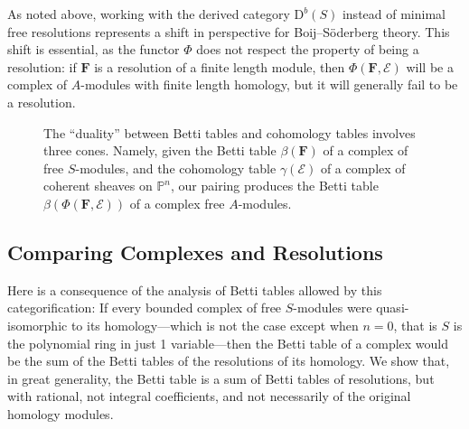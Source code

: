 \documentclass[12pt]{amsart}
\theoremstyle{definition}
\theoremstyle{remark}
\newcommand{\PP}{\mathbb{P}}
\newcommand{\cE}{\mathcal{E}}
\newcommand{\FF}{\mathbf{F}}
\newcommand{\DD}{\mathrm{D}}
\newcommand{\CQ}{\mathrm{C}}
\newcommand{\BBQ}{\mathrm{B}}
\begin{document}
As noted above, working with the derived category $\DD^b(S)$ instead of minimal free resolutions represents a shift in perspective for Boij--S\"oderberg theory.  This shift is essential, as the functor $\Phi$ does not respect the property of being a resolution: if $\FF$ is a resolution of a finite length module, then $\Phi(\FF,\cE)$ will be a complex of $A$-modules with finite length homology, but it will generally fail to be a resolution.  
\begin{figure}
\caption{The ``duality'' between Betti tables and cohomology tables involves three cones.  Namely, given the Betti table $\beta(\FF)$ of a complex of free $S$-modules, and the cohomology table $\gamma(\cE)$ of a complex of coherent sheaves on $\PP^n$, our pairing produces the Betti table $\beta(\Phi(\FF,\cE))$ of a complex free $A$-modules.
}
\label{fig:bracket}
\end{figure}

\subsection*{Comparing Complexes and Resolutions} Here is a consequence of the analysis of Betti tables allowed by this categorification: If every bounded complex of free $S$-modules were quasi-isomorphic to its homology---which is not the case except when $n=0$, that is $S$ is the polynomial ring in just 1 variable---then the Betti table of a complex would be the sum of the Betti tables of the resolutions of its homology.  We show that, in great generality, the Betti table is  a sum of Betti tables of resolutions, but with rational, not integral coefficients, and not necessarily of the original homology modules. 
\end{document}
